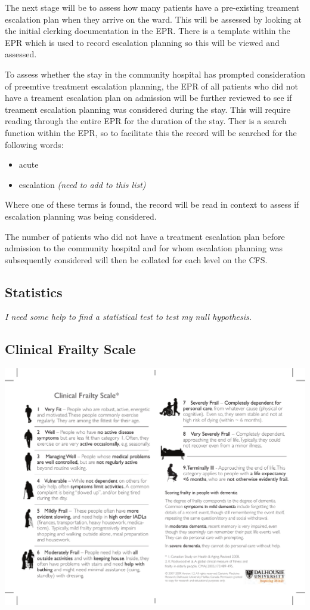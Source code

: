 \documentclass
[
	12pt,
	a4paper,
	oneside,
]{article}
\begin{document}
The next stage will be to assess how many patients have a pre-existing treament escalation plan
when they arrive on the ward. This will be assessed by looking at the initial clerking
documentation in the EPR. There is a template within the EPR which is used to record 
escalation planning so this will be viewed and assessed.

To assess whether the stay in the community hospital has prompted consideration of 
preemtive treatment escalation planning, the EPR of all patients who did not have a 
treament escalation plan on admission will be further reviewed to see if treament escalation
planning was considered during the stay. This will require reading through the entire 
EPR for the duration of the stay. Ther is a search function within the EPR, so to 
facilitate this the record will be searched for the following words:

\begin{itemize}
\item acute
\item escalation
\emph{(need to add to this list)}
\end{itemize}

Where one of these terms is found, the record will be read in context to assess if 
escalation planning was being considered.

The number of patients who did not have a treatment escalation plan before admission
to the community hospital and for whom escalation planning was subsequently considered will then be 
collated for each level on the CFS.

\subsection{Statistics}
\emph{I need some help to find a statistical test to test my null hypothesis.}
\clearpage
\printbibliography[prenote=needsfixing]

\clearpage
\begin{appendix}
\section{Clinical Frailty Scale}
\label{appendix:CFS}
\includegraphics[width=\textwidth]{CFS}
\end{appendix}
\end{document}

